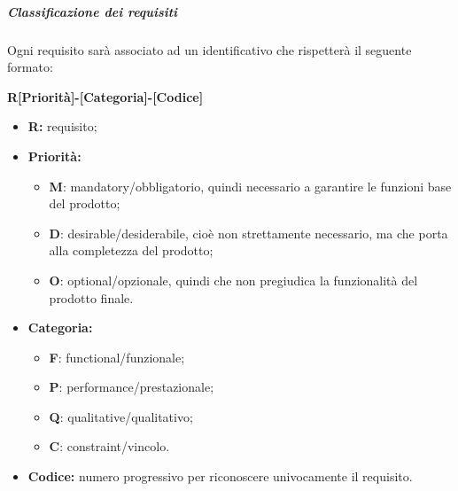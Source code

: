 			\subparagraph{Classificazione dei requisiti}
			Ogni requisito sarà associato ad un identificativo che rispetterà il seguente formato:
			\begin{center}
				\textbf{R[Priorità]-[Categoria]-[Codice]}
			\end{center}
			\begin{itemize}
				\item \textbf{R:} requisito;
				\item \textbf{Priorità:}
				\begin{itemize}
					\item \textbf{M}: mandatory/obbligatorio, quindi necessario a garantire le funzioni base del prodotto;
					\item \textbf{D}: desirable/desiderabile, cioè non strettamente necessario, ma che porta alla completezza del prodotto;
					\item \textbf{O}: optional/opzionale, quindi che non pregiudica la funzionalità del prodotto finale.
				\end{itemize}
				\item \textbf{Categoria:}
				\begin{itemize}
					\item \textbf{F}: functional/funzionale;
					\item \textbf{P}: performance/prestazionale;
					\item \textbf{Q}: qualitative/qualitativo;
					\item \textbf{C}: constraint/vincolo.
				\end{itemize}
				\item \textbf{Codice:} numero progressivo per riconoscere univocamente il requisito.
			\end{itemize}

